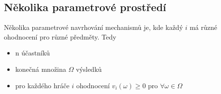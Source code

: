 \subsection{Několika parametrové prostředí}
\begin{definition}
    \label{def:multi_param}
    Několika parametrové navrhování mechanismů je, kde každý $i$ má různé ohodnocení pro různé předměty. 
    Tedy 
    \begin{itemize}
        \item n účastníků
        \item konečná množina $\Omega$ výsledků
        \item pro každého hráče $i$ ohodnocení $v_i(\omega) \geq 0$ pro $\forall \omega \in \Omega$
    \end{itemize}
\end{definition}

